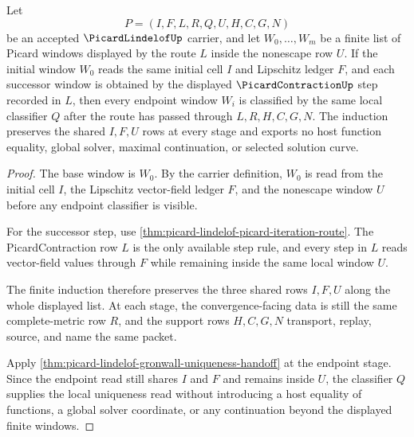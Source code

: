 \begin{theorem}
\label{thm:picard-lindelof-local-uniqueness-induction}
Let
$$
P=(I,F,L,R,Q,U,H,C,G,N)
$$
be an accepted $\PicardLindelofUp$ carrier, and let $W_0,\ldots,W_m$ be a finite list of Picard windows displayed by the route $L$ inside the nonescape row $U$. If the initial window $W_0$ reads the same initial cell $I$ and Lipschitz ledger $F$, and each successor window is obtained by the displayed $\PicardContractionUp$ step recorded in $L$, then every endpoint window $W_i$ is classified by the same local classifier $Q$ after the route has passed through $L,R,H,C,G,N$. The induction preserves the shared $I,F,U$ rows at every stage and exports no host function equality, global solver, maximal continuation, or selected solution curve.
\end{theorem}
\begin{proof}
The base window is $W_0$. By the carrier definition, $W_0$ is read from the initial cell $I$, the Lipschitz vector-field ledger $F$, and the nonescape window $U$ before any endpoint classifier is visible.

For the successor step, use \autoref{thm:picard-lindelof-picard-iteration-route}. The PicardContraction row $L$ is the only available step rule, and every step in $L$ reads vector-field values through $F$ while remaining inside the same local window $U$.

The finite induction therefore preserves the three shared rows $I,F,U$ along the whole displayed list. At each stage, the convergence-facing data is still the same complete-metric row $R$, and the support rows $H,C,G,N$ transport, replay, source, and name the same packet.

Apply \autoref{thm:picard-lindelof-gronwall-uniqueness-handoff} at the endpoint stage. Since the endpoint read still shares $I$ and $F$ and remains inside $U$, the classifier $Q$ supplies the local uniqueness read without introducing a host equality of functions, a global solver coordinate, or any continuation beyond the displayed finite windows.
\end{proof}

